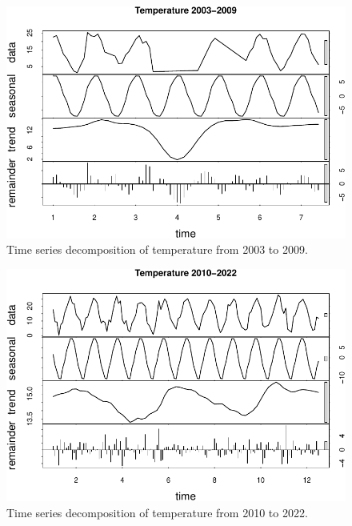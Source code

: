 \documentclass[
  12pt,
]{article}
\begin{document}
\begin{figure}

{\centering \includegraphics{Fischer_WDA_FinalProject_files/figure-latex/Plot of Early Temperature Time Series Decomposition-1} 

}

\caption{Time series decomposition of temperature from 2003 to 2009.}\label{fig:Plot of Early Temperature Time Series Decomposition}
\end{figure}

\begin{figure}

{\centering \includegraphics{Fischer_WDA_FinalProject_files/figure-latex/Plot of Late Temperature Time Series Decomposition-1} 

}

\caption{Time series decomposition of temperature from 2010 to 2022.}\label{fig:Plot of Late Temperature Time Series Decomposition}
\end{figure}
\end{document}
